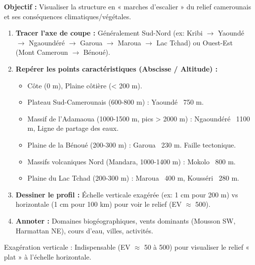 \documentclass[11pt]{article}
\newcommand{\cle}[1]{{\popxbold\color{popdark}#1}}
\begin{document}
\begin{methode}
\textbf{Objectif :} Visualiser la structure en « marches d'escalier » du relief camerounais et ses conséquences climatiques/végétales.
\begin{enumerate}
    \item \textbf{Tracer l'axe de coupe :} Généralement Sud-Nord (ex: Kribi $\rightarrow$ Yaoundé $\rightarrow$ Ngaoundéré $\rightarrow$ Garoua $\rightarrow$ Maroua $\rightarrow$ Lac Tchad) ou Ouest-Est (Mont Cameroun $\rightarrow$ Bénoué).
    \item \textbf{Repérer les points caractéristiques (Abscisse / Altitude) :}
    \begin{itemize}
        \item Côte (0 m), Plaine côtière (< 200 m).
        \item Plateau Sud-Camerounais (600-800 m) : Yaoundé ~750 m.
        \item Massif de l'Adamaoua (1000-1500 m, pics > 2000 m) : Ngaoundéré ~1100 m, Ligne de partage des eaux.
        \item Plaine de la Bénoué (200-300 m) : Garoua ~230 m. Faille tectonique.
        \item Massifs volcaniques Nord (Mandara, 1000-1400 m) : Mokolo ~800 m.
        \item Plaine du Lac Tchad (200-300 m) : Maroua ~400 m, Kousséri ~280 m.
    \end{itemize}
    \item \textbf{Dessiner le profil :} Échelle verticale exagérée (ex: 1 cm pour 200 m) vs horizontale (1 cm pour 100 km) pour voir le relief (EV $\approx$ 500).
    \item \textbf{Annoter :} Domaines biogéographiques, vents dominants (Mousson SW, Harmattan NE), cours d'eau, villes, activités.
\end{enumerate}
\cle{Exagération verticale} : Indispensable (EV $\approx$ 50 à 500) pour visualiser le relief « plat » à l'échelle horizontale.
\end{methode}
\end{document}
